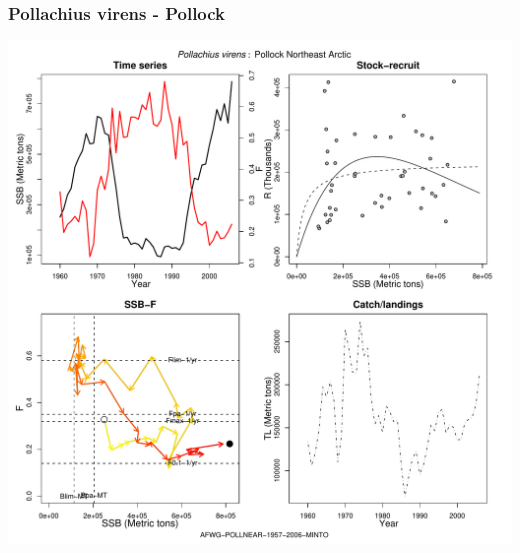 \subsubsection{Pollachius virens - Pollock}
\begin{center}
\includegraphics[width=1.2\textwidth]{../R/figures/AFWG-POLLNEAR-1957-2006-MINTO.pdf}
\end{center}

